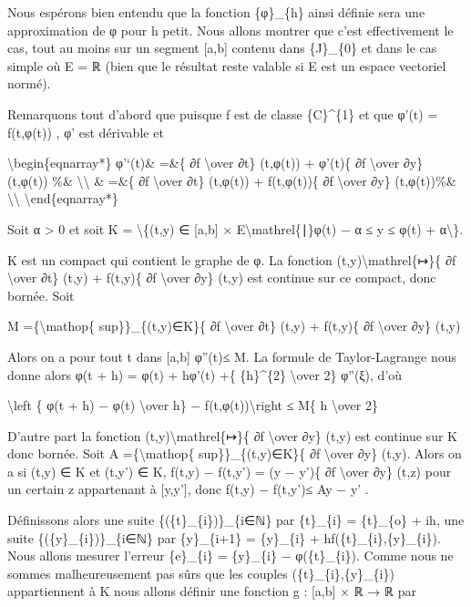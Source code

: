 \documentclass[]{article}
\begin{document}
Nous espérons bien entendu que la fonction \{φ\}\_\{h\} ainsi définie
sera une approximation de φ pour h petit. Nous allons montrer que c'est
effectivement le cas, tout au moins sur un segment {[}a,b{]} contenu
dans \{J\}\_\{0\} et dans le cas simple où E = ℝ (bien que le résultat
reste valable si E est un espace vectoriel normé).

Remarquons tout d'abord que puisque f est de classe \{C\}\^{}\{1\} et
que φ'(t) = f(t,φ(t)) , φ' est dérivable et

\textbackslash{}begin\{eqnarray*\} φ'`(t)\& =\&\{ ∂f
\textbackslash{}over ∂t\} (t,φ(t)) + φ'(t)\{ ∂f \textbackslash{}over
∂y\} (t,φ(t)) \%\& \textbackslash{}\textbackslash{} \& =\&\{ ∂f
\textbackslash{}over ∂t\} (t,φ(t)) + f(t,φ(t))\{ ∂f \textbackslash{}over
∂y\} (t,φ(t))\%\& \textbackslash{}\textbackslash{}
\textbackslash{}end\{eqnarray*\}

Soit α \textgreater{} 0 et soit K = \textbackslash{}\{(t,y) ∈ {[}a,b{]}
× E\textbackslash{}mathrel\{∣\}φ(t) − α ≤ y ≤ φ(t) +
α\textbackslash{}\}.

K est un compact qui contient le graphe de φ. La fonction
(t,y)\textbackslash{}mathrel\{↦\}\{ ∂f \textbackslash{}over ∂t\} (t,y) +
f(t,y)\{ ∂f \textbackslash{}over ∂y\} (t,y) est continue sur ce compact,
donc bornée. Soit

M =\{\textbackslash{}mathop\{ sup\}\}\_\{(t,y)∈K\}\textbar{}\{ ∂f
\textbackslash{}over ∂t\} (t,y) + f(t,y)\{ ∂f \textbackslash{}over ∂y\}
(t,y)\textbar{}

Alors on a pour tout t dans {[}a,b{]} \textbar{}φ''(t)\textbar{}≤ M. La
formule de Taylor-Lagrange nous donne alors φ(t + h) = φ(t) + hφ'(t) +\{
\{h\}\^{}\{2\} \textbackslash{}over 2\} φ''(ξ), d'où

\textbackslash{}left \textbar{}\{ φ(t + h) − φ(t) \textbackslash{}over
h\} − f(t,φ(t))\textbackslash{}right \textbar{}≤ M\{
\textbar{}h\textbar{} \textbackslash{}over 2\}

D'autre part la fonction (t,y)\textbackslash{}mathrel\{↦\}\{ ∂f
\textbackslash{}over ∂y\} (t,y) est continue sur K donc bornée. Soit A
=\{\textbackslash{}mathop\{ sup\}\}\_\{(t,y)∈K\}\textbar{}\{ ∂f
\textbackslash{}over ∂y\} (t,y)\textbar{}. Alors on a si (t,y) ∈ K et
(t,y') ∈ K, f(t,y) − f(t,y') = (y − y')\{ ∂f \textbackslash{}over ∂y\}
(t,z) pour un certain z appartenant à {[}y,y'{]}, donc \textbar{}f(t,y)
− f(t,y')\textbar{}≤ A\textbar{}y − y'\textbar{} .

Définissons alors une suite \{(\{t\}\_\{i\})\}\_\{i∈ℕ\} par \{t\}\_\{i\}
= \{t\}\_\{o\} + ih, une suite \{(\{y\}\_\{i\})\}\_\{i∈ℕ\} par
\{y\}\_\{i+1\} = \{y\}\_\{i\} + hf(\{t\}\_\{i\},\{y\}\_\{i\}). Nous
allons mesurer l'erreur \{e\}\_\{i\} = \textbar{}\{y\}\_\{i\} −
φ(\{t\}\_\{i\})\textbar{}. Comme nous ne sommes malheureusement pas sûrs
que les couples (\{t\}\_\{i\},\{y\}\_\{i\}) appartiennent à K nous
allons définir une fonction g : {[}a,b{]} × ℝ → ℝ par
\end{document}
